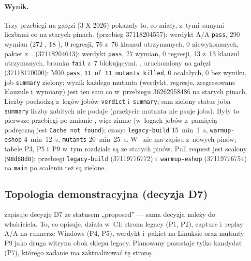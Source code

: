 \paragraph{Wynik.} Trzy przebiegi na gałęzi (3 X 2026) pokazały to, co miały, z~tymi samymi
liczbami co na starych pinach.  (przebieg 37118204557): werdykt A/A
\texttt{pass}, 290 wymian (272 , 18 ), 0 regresji,
76 z~76 klauzul utrzymanych, 0 niewykonanych, pakiet z~.
 (37118204643): werdykt \texttt{pass}, 27 wymian, 0 regresji, 13 z~13
klauzul utrzymanych, bramka \texttt{fail} z~7 blokującymi. , uruchomiony na
gałęzi (37118170000): M00 \texttt{pass}, \texttt{11 of 11 mutants killed}, 0 ocalałych, 0 bez
wyniku, job \texttt{summary} zielony; wynik każdego mutanta (werdykt, regresje, zregresowane
klauzule i~wymiany) jest ten sam co w~przebiegu 36262958486 na starych pinach. Liczby
pochodzą z~logów jobów \texttt{verdict} i~\texttt{summary}; sam zielony status joba
\texttt{summary} liczby zabitych nie podaje (przeżycie mutanta nie psuje joba). Były to
pierwsze przebiegi po zmianie , więc zimne (w~logach jobów z~pamięcią
podręczną jest \texttt{Cache not found}); czasy: \texttt{legacy-build} 15~min~1~s,
\texttt{warmup-eshop} 4~min~12~s, \texttt{mutants} 20~min~25~s. W~ nie ma
zapisu z~nowych pinów; tabele P3, P5 i~P9 w~tym rozdziale są ze starych pinów. Pull request
jest scalony (\texttt{98d88d8}); przebiegi \texttt{legacy-build} (37119776772)
i~\texttt{warmup-eshop} (37119776754) na \texttt{main} po scaleniu też są zielone.


\subsection{Topologia demonstracyjna (decyzja D7)}\label{sec:bench-topologia}

 zapisuje decyzję D7 ze statusem „proposed” --- sama decyzja
należy do właściciela. To, co opisuje, działa w~CI: strona legacy (P1, P2), capture
i~replay A/A na runnerze Windows (P4, P5), werdykt i~pakiet na Linuksie oraz mutanty P9
jako druga witryna obok sklepu legacy. Planowany pozostaje tylko kandydat (P7), którego
zadanie ma zaktualizować tę stronę.

